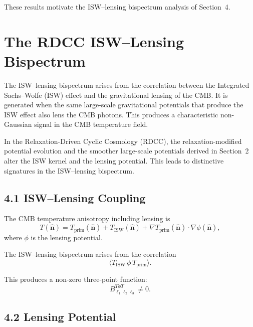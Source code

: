 \documentclass[11pt,a4paper]{article}
\begin{document}
These results motivate the ISW–lensing bispectrum analysis of Section~4.

\section{The RDCC ISW–Lensing Bispectrum}

The ISW–lensing bispectrum arises from the correlation between the Integrated Sachs–Wolfe 
(ISW) effect and the gravitational lensing of the CMB. It is generated when the same 
large-scale gravitational potentials that produce the ISW effect also lens the CMB photons. 
This produces a characteristic non-Gaussian signal in the CMB temperature field.

In the Relaxation-Driven Cyclic Cosmology (RDCC), the relaxation-modified potential 
evolution and the smoother large-scale potentials derived in Section~2 alter the ISW kernel 
and the lensing potential. This leads to distinctive signatures in the ISW–lensing 
bispectrum.

\subsection*{4.1 ISW–Lensing Coupling}

The CMB temperature anisotropy including lensing is
\begin{equation}
    T(\hat{\mathbf{n}})
    = T_{\mathrm{prim}}(\hat{\mathbf{n}})
      + T_{\mathrm{ISW}}(\hat{\mathbf{n}})
      + \nabla T_{\mathrm{prim}}(\hat{\mathbf{n}})\cdot\nabla\phi(\hat{\mathbf{n}}),
\end{equation}
where $\phi$ is the lensing potential.

The ISW–lensing bispectrum arises from the correlation
\begin{equation}
    \langle T_{\mathrm{ISW}}\,\phi\,T_{\mathrm{prim}} \rangle.
\end{equation}

This produces a non-zero three-point function:
\begin{equation}
    B_{\ell_{1}\ell_{2}\ell_{3}}^{T\phi T}
    \neq 0.
\end{equation}

\subsection*{4.2 Lensing Potential}
\end{document}
